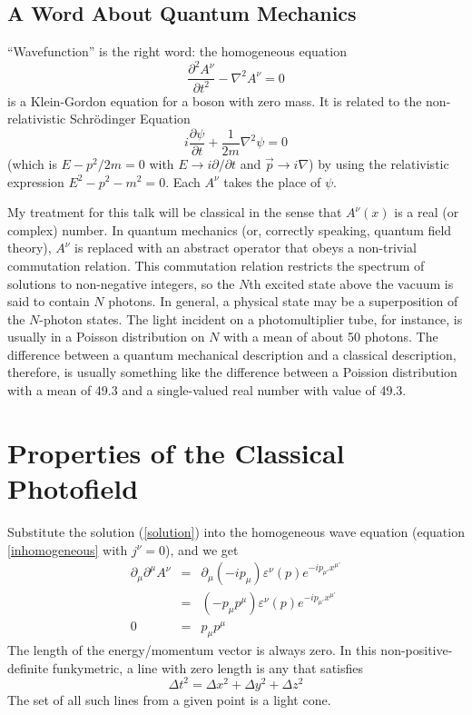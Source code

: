 \documentclass[12pt]{article}
\begin{document}
\subsection{A Word About Quantum Mechanics}

``Wavefunction'' is the right word: the homogeneous equation
\begin{equation}
  \frac{\partial^2 A^\nu}{\partial t^2} - \nabla^2 A^\nu = 0
\end{equation}
is a Klein-Gordon equation for a boson with zero mass.  It is related to
the non-relativistic Schr\"odinger Equation
\begin{equation}
  i\frac{\partial \psi}{\partial t} + \frac{1}{2m} \nabla^2 \psi = 0
\end{equation}
(which is $E - p^2/2m = 0$ with $E \to i \partial/\partial t$ and $\vec{p}
\to i\nabla$) by using the relativistic expression $E^2 - p^2 - m^2 =
0$.  Each $A^\nu$ takes the place of $\psi$.

My treatment for this talk will be classical in the sense that
$A^\nu(x)$ is a real (or complex) number.  In quantum mechanics (or,
correctly speaking, quantum field theory), $A^\nu$ is replaced with an
abstract operator that obeys a non-trivial commutation relation.  This
commutation relation restricts the spectrum of solutions to
non-negative integers, so the $N$th excited state above the vacuum is
said to contain $N$ photons.  In general, a physical state may be a
superposition of the $N$-photon states.  The light incident on a
photomultiplier tube, for instance, is usually in a Poisson
distribution on $N$ with a mean of about 50 photons.  The difference
between a quantum mechanical description and a classical description,
therefore, is usually something like the difference between a Poission
distribution with a mean of 49.3 and a single-valued real number with
value of 49.3.

\section{Properties of the Classical Photofield}

Substitute the solution (\ref{solution}) into the homogeneous wave equation
(equation \ref{inhomogeneous} with $j^\nu = 0$), and we get
\begin{eqnarray}
  \partial_\mu \partial^\mu A^\nu &=& \partial_\mu (-i p_\mu) \varepsilon^\nu(p) e^{-i p_{\mu'} x^{\mu'}} \\
  &=& (-p_\mu p^\mu) \varepsilon^\nu(p) e^{-i p_{\mu'} x^{\mu'}} \\
  0 &=& p_\mu p^\mu
\end{eqnarray}
The length of the energy/momentum vector is always zero.  In this
non-positive-definite funkymetric, a line with zero length is any that
satisfies
\begin{equation}
  \Delta t^2 = \Delta x^2 + \Delta y^2 + \Delta z^2
\end{equation}
The set of all such lines from a given point is a light cone.
\end{document}
